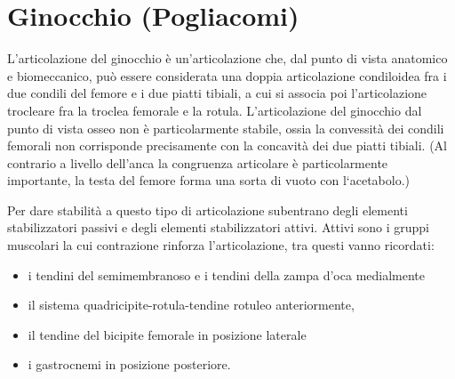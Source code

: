 \section{Ginocchio (Pogliacomi)}

L'articolazione del ginocchio è un'articolazione che, dal punto di vista anatomico e biomeccanico, può essere considerata una doppia articolazione condiloidea fra i due condili del femore e i due piatti tibiali, a cui si associa poi l'articolazione trocleare fra la troclea
femorale e la rotula.
L'articolazione del ginocchio dal punto di vista osseo non è particolarmente stabile, ossia la convessità dei condili femorali non corrisponde precisamente con la concavità dei due piatti tibiali.
(Al contrario a livello dell'anca la congruenza articolare è particolarmente importante, la testa del femore forma una sorta di vuoto con l`acetabolo.)

Per dare stabilità a questo tipo di articolazione subentrano degli elementi stabilizzatori passivi e degli elementi stabilizzatori attivi. Attivi sono i gruppi muscolari la cui contrazione rinforza l'articolazione, tra questi vanno ricordati:

\begin{itemize}
\item
  i tendini del semimembranoso e i tendini della zampa d'oca medialmente
\item
  il sistema quadricipite-rotula-tendine rotuleo anteriormente,
\item
  il tendine del bicipite femorale in posizione laterale
\item
  i gastrocnemi in posizione posteriore.
\end{itemize}

